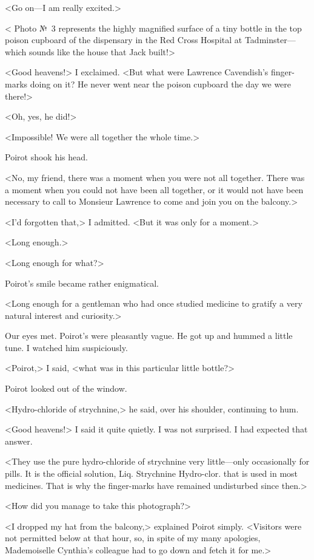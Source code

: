  <Go on—I am really excited.> 

 < Photo №~3 represents the highly magnified surface of a tiny bottle in the top poison cupboard of the dispensary in the Red Cross Hospital at Tadminster—which sounds like the house that Jack built!> 

 <Good heavens!> I exclaimed. <But what were Lawrence Cavendish's finger-marks doing on it? He never went near the poison cupboard the day we were there!> 

 <Oh, yes, he did!> 

 <Impossible! We were all together the whole time.> 

 Poirot shook his head. 

 <No, my friend, there was a moment when you were not all together. There was a moment when you could not have been all together, or it would not have been necessary to call to Monsieur Lawrence to come and join you on the balcony.> 

 <I'd forgotten that,> I admitted. <But it was only for a moment.> 

 <Long enough.> 

 <Long enough for what?> 

 Poirot's smile became rather enigmatical. 

 <Long enough for a gentleman who had once studied medicine to gratify a very natural interest and curiosity.> 

 Our eyes met. Poirot's were pleasantly vague. He got up and hummed a little tune. I watched him suspiciously. 

 <Poirot,> I said, <what was in this particular little bottle?> 

 Poirot looked out of the window. 

 <Hydro-chloride of strychnine,> he said, over his shoulder, continuing to hum. 

 <Good heavens!> I said it quite quietly. I was not surprised. I had expected that answer. 

 <They use the pure hydro-chloride of strychnine very little—only occasionally for pills. It is the official solution, Liq. Strychnine Hydro-clor. that is used in most medicines. That is why the finger-marks have remained undisturbed since then.> 

 <How did you manage to take this photograph?> 

 <I dropped my hat from the balcony,> explained Poirot simply. <Visitors were not permitted below at that hour, so, in spite of my many apologies, Mademoiselle Cynthia's colleague had to go down and fetch it for me.> 

